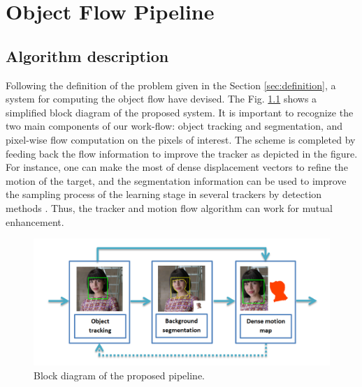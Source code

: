 
\chapter{Object Flow Pipeline} \label{chap:core}

\section{Algorithm description}
\label{sec:desc}

Following the definition of the problem given in the Section \ref{sec:definition}, a 
 system for computing the object flow have devised.
The Fig. \ref{figurelabel_sys} shows a simplified block diagram of the proposed system. It is important to recognize the two main 
components of our work-flow: object tracking and segmentation, and pixel-wise flow computation on the pixels of interest.  The scheme is completed by feeding back the flow 
information to improve the tracker as depicted in the figure. For instance, one can make the most of dense displacement vectors to refine the motion of the target, and 
the segmentation information can be used to improve the sampling process of the learning stage in several trackers by detection methods \cite{c22}. Thus, 
the tracker and motion flow algorithm can work for mutual enhancement.

   \begin{figure}[thpb]
      \centering
      \includegraphics[width=1.00\textwidth]{../images/system.png}
      \caption{Block diagram of the proposed pipeline.}
      \label{figurelabel_sys}
   \end{figure}

